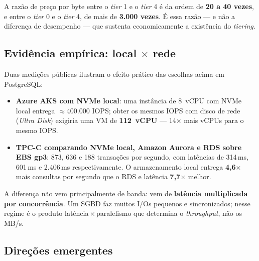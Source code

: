 \documentclass[11pt,a4paper]{article}
\begin{document}
A razão de preço por byte entre o \emph{tier} 1 e o \emph{tier} 4 é da ordem de
\textbf{20 a 40 vezes}, e entre o \emph{tier} 0 e o \emph{tier} 4, de mais de
\textbf{3.000 vezes}. É essa razão --- e não a diferença de desempenho --- que sustenta
economicamente a existência do \emph{tiering}.

\subsection{Evidência empírica: local $\times$ rede}

Duas medições públicas ilustram o efeito prático das escolhas acima em PostgreSQL:

\begin{itemize}
\item \textbf{Azure AKS com NVMe local}: uma instância de 8~vCPU com NVMe local entrega
      $\approx$400.000 IOPS; obter os mesmos IOPS com disco de rede (\emph{Ultra Disk})
      exigiria uma VM de \textbf{112~vCPU} --- 14$\times$ mais vCPUs para o mesmo IOPS.
\item \textbf{TPC-C comparando NVMe local, Amazon Aurora e RDS sobre EBS gp3}: 873, 636 e
      188 transações por segundo, com latências de 314\,ms, 601\,ms e 2.406\,ms
      respectivamente. O armazenamento local entrega \textbf{4,6$\times$} mais consultas por
      segundo que o RDS e latência \textbf{7,7$\times$} melhor.
\end{itemize}

A diferença não vem principalmente de banda: vem de \textbf{latência multiplicada por
concorrência}. Um SGBD faz muitos I/Os pequenos e sincronizados; nesse regime é o produto
latência\,$\times$\,paralelismo que determina o \emph{throughput}, não os MB/s.

\subsection{Direções emergentes}
\end{document}
